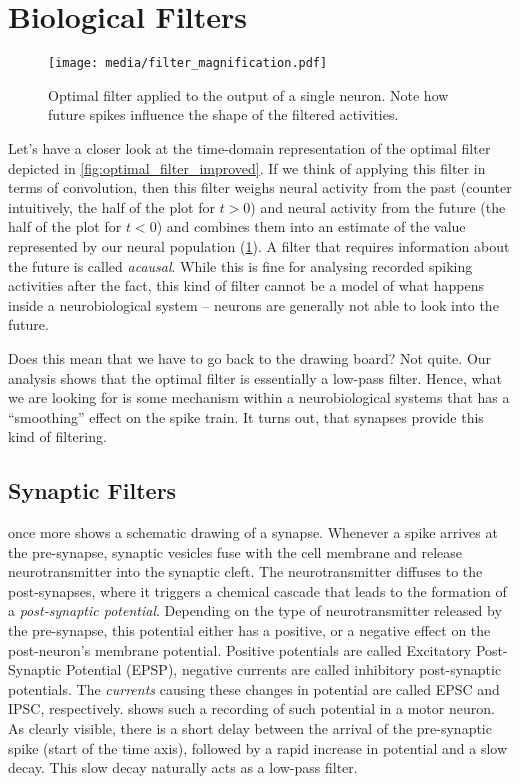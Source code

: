 \documentclass[10pt,letterpaper,oneside]{article}
\begin{document}
\newpage

\section{Biological Filters}

\begin{figure}
	\texttt{[image: media/filter\_magnification.pdf]}
	\caption{Optimal filter applied to the output of a single neuron. Note how future spikes influence the shape of the filtered activities.}
	\label{fig:filter_magnification}
\end{figure}

Let's have a closer look at the time-domain representation of the optimal filter depicted in \cref{fig:optimal_filter_improved}. If we think of applying this filter in terms of convolution, then this filter weighs neural activity from the past (counter intuitively, the half of the plot for $t > 0$) and neural activity from the future (the half of the plot for $t < 0$) and combines them into an estimate of the value represented by our neural population (\cref{fig:filter_magnification}). A filter that requires information about the future is called \emph{acausal}. While this is fine for analysing recorded spiking activities after the fact, this kind of filter cannot be a model of what happens inside a neurobiological system -- neurons are generally not able to look into the future.

Does this mean that we have to go back to the drawing board? Not quite. Our analysis shows that the optimal filter is essentially a low-pass filter. Hence, what we are looking for is some mechanism within a neurobiological systems that has a \enquote{smoothing} effect on the spike train. It turns out, that synapses provide this kind of filtering.

\subsection{Synaptic Filters}

 once more shows a schematic drawing of a synapse. Whenever a spike arrives at the pre-synapse, synaptic vesicles fuse with the cell membrane and release neurotransmitter into the synaptic cleft. The neurotransmitter diffuses to the post-synapses, where it triggers a chemical cascade that leads to the formation of a \emph{post-synaptic potential}. Depending on the type of neurotransmitter released by the pre-synapse, this potential either has a positive, or a negative effect on the post-neuron's membrane potential. Positive potentials are called Excitatory Post-Synaptic Potential (EPSP), negative currents are called inhibitory post-synaptic potentials. The \emph{currents} causing these changes in potential are called EPSC and IPSC, respectively.  shows such a recording of such potential in a motor neuron. As clearly visible, there is a short delay between the arrival of the pre-synaptic spike (start of the time axis), followed by a rapid increase in potential and a slow decay. This slow decay naturally acts as a low-pass filter.
\end{document}
